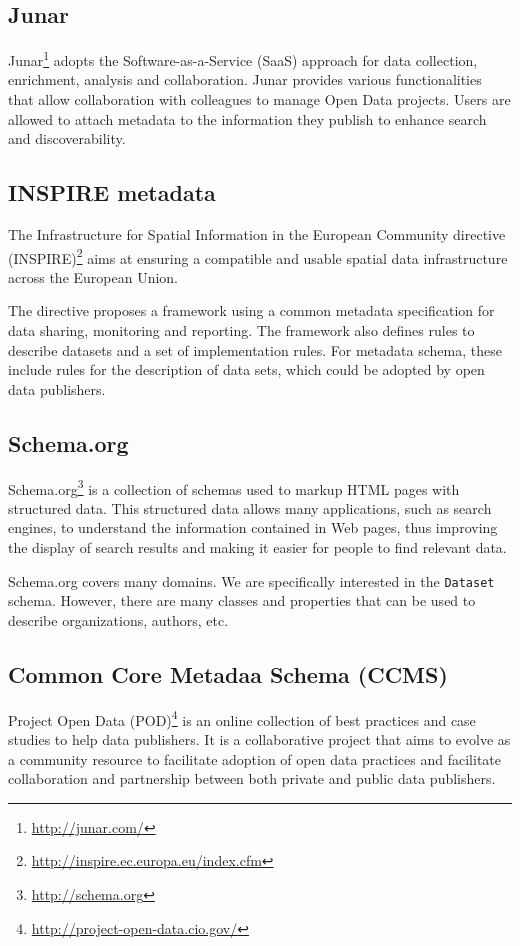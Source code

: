 \subsection{Junar}
Junar\footnote{\url{http://junar.com/}} adopts the Software-as-a-Service (SaaS) approach for data collection, enrichment, analysis and collaboration. Junar provides various functionalities that allow collaboration with colleagues to manage Open Data projects. Users are allowed to attach metadata to the information they publish to enhance search and discoverability.

\subsection{INSPIRE metadata}
The Infrastructure for Spatial Information in the European Community directive (INSPIRE)\footnote{\url{http://inspire.ec.europa.eu/index.cfm}} aims at ensuring a compatible and usable spatial data infrastructure across the European Union.

The directive proposes a framework using a common metadata specification for data sharing, monitoring and reporting. The framework also defines rules to describe datasets and a set of implementation rules. For metadata schema, these include rules for the description of data sets, which could be adopted by open data publishers.

\subsection{Schema.org}
Schema.org\footnote{\url{http://schema.org}} is a collection of schemas used to markup HTML pages with structured data. This structured data allows many applications, such as search engines, to understand the information contained in Web pages, thus improving the display of search results and making it easier for people to find relevant data.

Schema.org covers many domains. We are specifically interested in the \texttt{Dataset} schema. However, there are many classes and properties that can be used to describe organizations, authors, etc.

\subsection{Common Core Metadaa Schema (CCMS)}
Project Open Data (POD)\footnote{\url{http://project-open-data.cio.gov/}} is an online collection of best practices and case studies to help data publishers. It is a collaborative project that aims to evolve as a community resource to facilitate adoption of open data practices and facilitate collaboration and partnership between both private and public data publishers.

